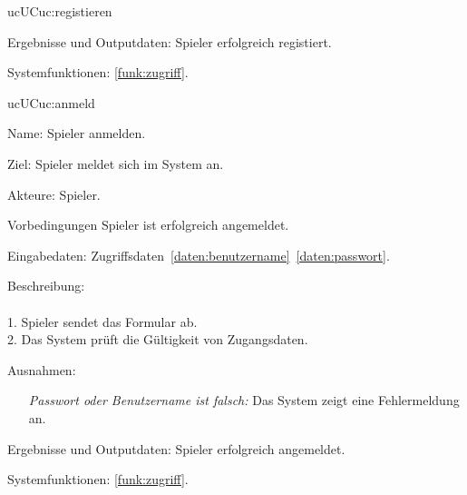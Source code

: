 \begin{description}[leftmargin=5em, style=sameline]
\begin{lhp}{uc}{UC}{uc:registieren}
\begin{itemize}
	\end{itemize}
	\item [Ergebnisse und Outputdaten:] Spieler erfolgreich registiert.	
	\item [Systemfunktionen:] \ref{funk:zugriff}.
    \end{lhp}
	
	\begin{lhp}{uc}{UC}{uc:anmeld}
		\item [Name:] Spieler anmelden.
		\item [Ziel:] Spieler meldet sich im System an.
		\item [Akteure:] Spieler.
		\item [Vorbedingungen] Spieler ist erfolgreich angemeldet.
		\item [Eingabedaten:] Zugriffsdaten~\ref{daten:benutzername}~\ref{daten:passwort}.
		\item [Beschreibung:] \hfill\\ \hfill\\
			1. Spieler sendet das Formular ab.\\
			2. Das System prüft die Gültigkeit von Zugangsdaten.\\				
		\item [Ausnahmen:]\hfill 
	    	\begin{itemize} 
			    \item[] \textit{Passwort oder Benutzername ist falsch:} Das System zeigt eine Fehlermeldung an.					
			
		    \end{itemize}
		\item [Ergebnisse und Outputdaten:] Spieler erfolgreich angemeldet.	
		\item [Systemfunktionen:] \ref{funk:zugriff}.
	\end{lhp}
	

\end{description}

